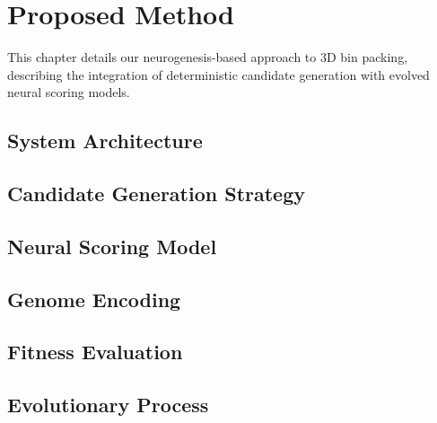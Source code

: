 \chapter{Proposed Method}

This chapter details our neurogenesis-based approach to 3D bin packing, describing the integration of deterministic candidate generation with evolved neural scoring models.

\section{System Architecture}


\section{Candidate Generation Strategy}


\section{Neural Scoring Model}


\section{Genome Encoding}


\section{Fitness Evaluation}


\section{Evolutionary Process}


